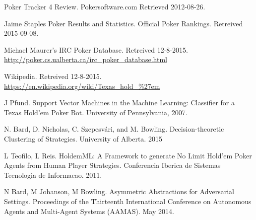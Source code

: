 \documentclass[twoside]{article}
\begin{document}
\begin{multicols}{2}
\begin{thebibliography}{99}
 Poker Tracker 4 Review. Pokersoftware.com Retrieved 2012-08-26.

 Jaime Staples Poker Results and Statistics. Official Poker Rankings. Retreived 2015-09-08.

 Michael Maurer's IRC Poker Database. Retreived 12-8-2015.
\url{http://poker.cs.ualberta.ca/irc_poker_database.html}

 Wikipedia. Retreived 12-8-2015.
\url{https://en.wikipedia.org/wiki/Texas_hold_%27em}

 J Pfund. Support Vector Machines in the Machine Learning: Classifier for a Texas Hold'em Poker Bot.  University of Pennsylvania, 2007.

 N. Bard, D. Nicholas, C. Szepesvári, and M. Bowling. Decision-theoretic Clustering of Strategies. University of Alberta. 2015

 L Teofilo, L Reis. HoldemML: A Framework to generate No Limit Hold’em Poker Agents from Human Player Strategies. Conferencia Iberica de Sistemas Tecnologia de Informacao. 2011.

 N Bard, M Johanson, M Bowling. Asymmetric Abstractions for Adversarial Settings. Proceedings of the Thirteenth International Conference on Autonomous Agents and Multi-Agent Systems (AAMAS). May 2014.
\end{thebibliography}


\end{multicols}
\end{document}
